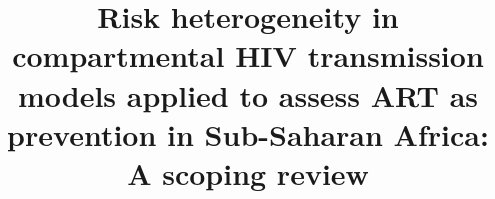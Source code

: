\usepackage{authblk}
\title{%
  Risk heterogeneity in compartmental HIV transmission models
  applied to assess ART as prevention in Sub-Saharan Africa:\\
  A scoping review}
